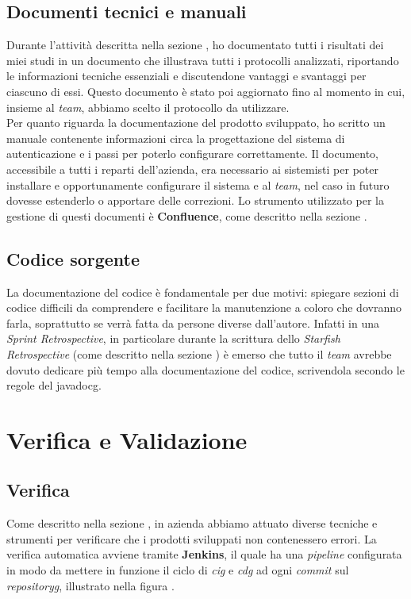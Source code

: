\subsection{Documenti tecnici e manuali}
Durante l'attività descritta nella sezione , ho documentato tutti i risultati dei miei studi in un documento che illustrava tutti i protocolli analizzati, riportando le informazioni tecniche essenziali e discutendone vantaggi e svantaggi per ciascuno di essi. Questo documento è stato poi aggiornato fino al momento in cui, insieme al \textit{team}, abbiamo scelto il protocollo da utilizzare. \\
Per quanto riguarda la documentazione del prodotto sviluppato, ho scritto un manuale contenente informazioni circa la progettazione del sistema di autenticazione e i passi per poterlo configurare correttamente. Il documento, accessibile a tutti i reparti dell'azienda, era necessario ai sistemisti per poter installare e opportunamente configurare il sistema e al \textit{team}, nel caso in futuro dovesse estenderlo o apportare delle correzioni.
Lo strumento utilizzato per la gestione di questi documenti è \textbf{Confluence}, come descritto nella sezione .

\subsection{Codice sorgente}
La documentazione del codice è fondamentale per due motivi: spiegare sezioni di codice difficili da comprendere e facilitare la manutenzione a coloro che dovranno farla, soprattutto se verrà fatta da persone diverse dall'autore. Infatti in una \textit{Sprint Retrospective}, in particolare durante la scrittura dello \textit{Starfish Retrospective} (come descritto nella sezione ) è emerso che tutto il \textit{team} avrebbe dovuto dedicare più tempo alla documentazione del codice, scrivendola secondo le regole del \gls{javadocg}.


\section{Verifica e Validazione}
\subsection{Verifica}
Come descritto nella sezione , in azienda abbiamo attuato diverse tecniche e strumenti per verificare che i prodotti sviluppati non contenessero errori. La verifica automatica avviene tramite \textbf{Jenkins}, il quale ha una \textit{pipeline} configurata in modo da mettere in funzione il ciclo di \textit{\gls{cig}} e \textit{\gls{cdg}} ad ogni \textit{commit} sul \textit{\gls{repositoryg}}, illustrato nella figura .
